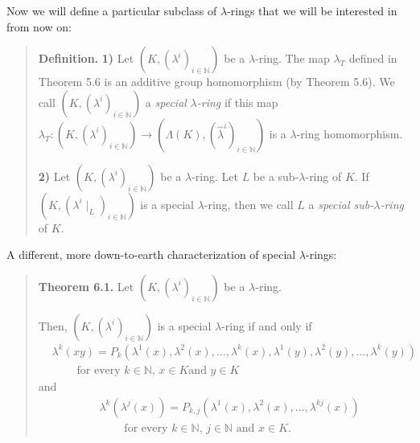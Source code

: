 \documentclass[12pt,final,notitlepage,onecolumn,german]{article}%
\begin{document}
Now we will define a particular subclass of $\lambda$-rings that we will be
interested in from now on:

\begin{quote}
\textbf{Definition.} \textbf{1)} Let $\left(  K,\left(  \lambda^{i}\right)
_{i\in\mathbb{N}}\right)  $ be a $\lambda$-ring. The map $\lambda_{T}$ defined
in Theorem 5.6 is an additive group homomorphism (by Theorem 5.6). We call
$\left(  K,\left(  \lambda^{i}\right)  _{i\in\mathbb{N}}\right)  $ a
\textit{special }$\lambda$\textit{-ring} if this map $\lambda_{T}:\left(
K,\left(  \lambda^{i}\right)  _{i\in\mathbb{N}}\right)  \rightarrow\left(
\Lambda\left(  K\right)  ,\left(  \widehat{\lambda}^{i}\right)  _{i\in
\mathbb{N}}\right)  $ is a $\lambda$-ring homomorphism.

\textbf{2)} Let $\left(  K,\left(  \lambda^{i}\right)  _{i\in\mathbb{N}%
}\right)  $ be a $\lambda$-ring. Let $L$ be a sub-$\lambda$-ring of $K$. If
$\left(  K,\left(  \lambda^{i}\mid_{L}\right)  _{i\in\mathbb{N}}\right)  $ is
a special $\lambda$-ring, then we call $L$ a \textit{special sub-}$\lambda
$\textit{-ring} of $K$.
\end{quote}

A different, more down-to-earth characterization of special $\lambda$-rings:

\begin{quote}
\textbf{Theorem 6.1.} Let $\left(  K,\left(  \lambda^{i}\right)
_{i\in\mathbb{N}}\right)  $ be a $\lambda$-ring.

Then, $\left(  K,\left(  \lambda^{i}\right)  _{i\in\mathbb{N}}\right)  $ is a
special $\lambda$-ring if and only if%
\begin{align}
&  \lambda^{k}\left(  xy\right)  =P_{k}\left(  \lambda^{1}\left(  x\right)
,\lambda^{2}\left(  x\right)  ,...,\lambda^{k}\left(  x\right)  ,\lambda
^{1}\left(  y\right)  ,\lambda^{2}\left(  y\right)  ,...,\lambda^{k}\left(
y\right)  \right) \nonumber\\
&  \ \ \ \ \ \ \ \ \ \ \text{for every }k\in\mathbb{N}\text{, }x\in K\text{
and }y\in K \label{Lkxy}%
\end{align}
and%
\begin{align}
&  \lambda^{k}\left(  \lambda^{j}\left(  x\right)  \right)  =P_{k,j}\left(
\lambda^{1}\left(  x\right)  ,\lambda^{2}\left(  x\right)  ,...,\lambda
^{kj}\left(  x\right)  \right) \nonumber\\
&  \ \ \ \ \ \ \ \ \ \ \text{for every }k\in\mathbb{N}\text{, }j\in
\mathbb{N}\text{ and }x\in K. \label{LkLjx}%
\end{align}



\end{quote}
\end{document}
